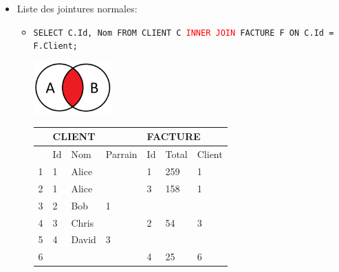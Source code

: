 \documentclass[a4paper]{article}
\begin{document}
\begin{itemize}
\item Liste des jointures normales:
\begin{itemize}


    \item \texttt{SELECT C.Id, Nom FROM CLIENT C \textcolor{red}{INNER JOIN} FACTURE F ON C.Id = F.Client;}
    \begin{center}
        \includegraphics[width=0.25\textwidth]{../images/inner-join-01.PNG}
    \end{center}
    \begin{center}
        \begin{tabular}{|l|l|l|l|l|l|l|} \hline
            & \multicolumn{3}{l|}{CLIENT} & \multicolumn{3}{l|}{FACTURE} \\ \hline
            & Id & Nom & Parrain & Id & Total & Client \\ \hline
            \rowcolor{orange!30}
            1 & 1 & Alice &   & 1 & 259 & 1 \\ \hline
            \rowcolor{orange!30}
            2 & 1 & Alice &   & 3 & 158 & 1 \\ \hline
            3 & 2 &   Bob & 1 &   &     &   \\ \hline
            \rowcolor{orange!30}
            4 & 3 & Chris &   & 2 &  54 & 3 \\ \hline
            5 & 4 & David & 3 &   &     &   \\ \hline
            6 &   &       &   & 4 &  25 & 6 \\ \hline
        \end{tabular}
    \end{center}



\end{itemize}
\end{itemize}
\end{document}
